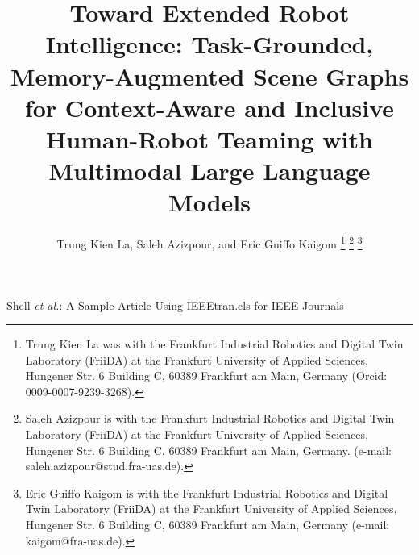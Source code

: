 \documentclass[lettersize,journal]{IEEEtran}
\begin{document}
	
	\title{Toward Extended Robot Intelligence: Task-Grounded, Memory-Augmented Scene Graphs for Context-Aware and Inclusive Human-Robot Teaming with Multimodal Large Language Models}
	
	\author{Trung Kien La, Saleh Azizpour, and Eric Guiffo Kaigom
		\thanks{Trung Kien La was with the Frankfurt Industrial Robotics and Digital Twin Laboratory (FriiDA) at the Frankfurt University of Applied Sciences, Hungener Str. 6 Building C, 60389 Frankfurt am Main, Germany (Orcid: 0009-0007-9239-3268).}%
		\thanks{Saleh Azizpour is with the Frankfurt Industrial Robotics and Digital Twin Laboratory (FriiDA) at the Frankfurt University of Applied Sciences, Hungener Str. 6 Building C, 60389 Frankfurt am Main, Germany. (e-mail: saleh.azizpour@stud.fra-uas.de).}%
		\thanks{Eric Guiffo Kaigom is with the Frankfurt Industrial Robotics and Digital Twin Laboratory (FriiDA) at the Frankfurt University of Applied Sciences, Hungener Str. 6 Building C, 60389 Frankfurt am Main, Germany (e-mail: kaigom@fra-uas.de).}}
	
	{Shell \MakeLowercase{\textit{et al.}}: A Sample Article Using IEEEtran.cls for IEEE Journals}
	
	
	\maketitle
	
\end{document}
